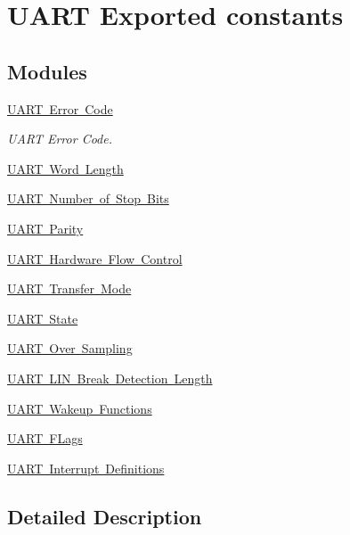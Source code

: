\hypertarget{group___u_a_r_t___exported___constants}{}\section{U\+A\+RT Exported constants}
\label{group___u_a_r_t___exported___constants}
\subsection*{Modules}
\begin{DoxyCompactItemize}
\item 
\mbox{\hyperlink{group___u_a_r_t___error___code}{U\+A\+R\+T Error Code}}
\begin{DoxyCompactList}\small\item\em U\+A\+RT Error Code. \end{DoxyCompactList}\item 
\mbox{\hyperlink{group___u_a_r_t___word___length}{U\+A\+R\+T Word Length}}
\item 
\mbox{\hyperlink{group___u_a_r_t___stop___bits}{U\+A\+R\+T Number of Stop Bits}}
\item 
\mbox{\hyperlink{group___u_a_r_t___parity}{U\+A\+R\+T Parity}}
\item 
\mbox{\hyperlink{group___u_a_r_t___hardware___flow___control}{U\+A\+R\+T Hardware Flow Control}}
\item 
\mbox{\hyperlink{group___u_a_r_t___mode}{U\+A\+R\+T Transfer Mode}}
\item 
\mbox{\hyperlink{group___u_a_r_t___state}{U\+A\+R\+T State}}
\item 
\mbox{\hyperlink{group___u_a_r_t___over___sampling}{U\+A\+R\+T Over Sampling}}
\item 
\mbox{\hyperlink{group___u_a_r_t___l_i_n___break___detection___length}{U\+A\+R\+T L\+I\+N Break Detection Length}}
\item 
\mbox{\hyperlink{group___u_a_r_t___wake_up__functions}{U\+A\+R\+T Wakeup Functions}}
\item 
\mbox{\hyperlink{group___u_a_r_t___flags}{U\+A\+R\+T F\+Lags}}
\item 
\mbox{\hyperlink{group___u_a_r_t___interrupt__definition}{U\+A\+R\+T Interrupt Definitions}}
\end{DoxyCompactItemize}


\subsection{Detailed Description}
